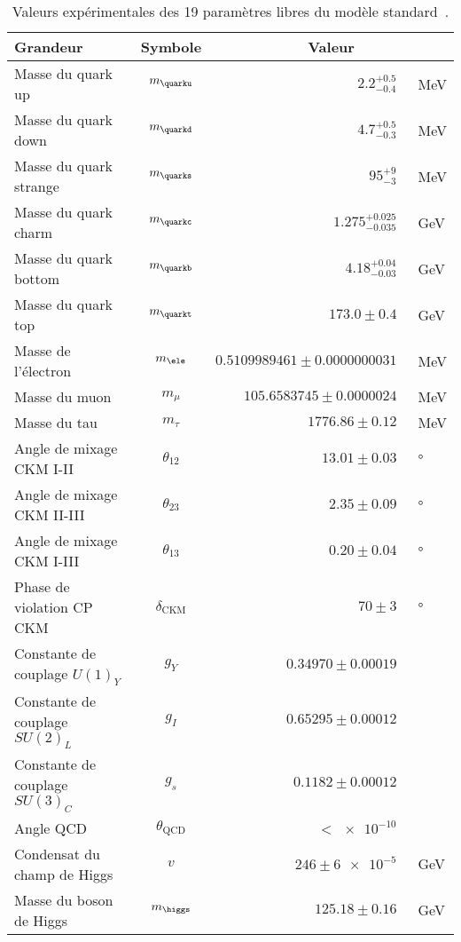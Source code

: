 \begin{table}
\centering
\begin{tabular}{lcrl}
\toprule
Grandeur & Symbole & \multicolumn{2}{c}{Valeur} \\
\midrule
Masse du quark up & $m_{\quarku}$ & $\num{2.2}^{+\num{0.5}}_{-\num{0.4}}$ & \SI{}{\MeV} \\
Masse du quark down & $m_{\quarkd}$ & $\num{4.7}^{+\num{0.5}}_{-\num{0.3}}$ & \SI{}{\MeV} \\
Masse du quark strange & $m_{\quarks}$ & $\num{95}^{+\num{9}}_{-\num{3}}$ & \SI{}{\MeV} \\
Masse du quark charm & $m_{\quarkc}$ & $\num{1.275}^{+\num{0.025}}_{-\num{0.035}}$ & \SI{}{\GeV} \\
Masse du quark bottom & $m_{\quarkb}$ & $\num{4.18}^{+\num{0.04}}_{-\num{0.03}}$ & \SI{}{\GeV} \\
Masse du quark top & $m_{\quarkt}$ & $\num{173.0}\pm\num{0.4}$ & \SI{}{\GeV} \\
Masse de l'électron & $m_{\ele}$ & $\num{0.5109989461}\pm\num{0.0000000031}$ & \SI{}{\MeV} \\
Masse du muon & $m_{\mu}$ & $\num{105.6583745}\pm\num{0.0000024}$ & \SI{}{\MeV} \\
Masse du tau & $m_{\tau}$ & $\num{1776.86}\pm\num{0.12}$ & \SI{}{\MeV} \\
Angle de mixage CKM I-II & $\theta_{12}$ & $\num{13.01}\pm\num{0.03}$ & \SI{}{\degree} \\
Angle de mixage CKM II-III & $\theta_{23}$ & $\num{2.35}\pm\num{0.09}$ & \SI{}{\degree} \\
Angle de mixage CKM I-III & $\theta_{13}$ & $\num{0.20}\pm\num{0.04}$ & \SI{}{\degree} \\
Phase de violation CP CKM & $\delta_{\text{CKM}}$ & $\num{70}\pm\num{3}$ & \SI{}{\degree} \\
Constante de couplage $U(1)_Y$ & $g_Y$ & $\num{0.34970}\pm\num{0.00019}$ & \\
Constante de couplage $SU(2)_L$ & $g_I$ & $\num{0.65295}\pm\num{0.00012}$ & \\
Constante de couplage $SU(3)_C$ & $g_s$ & $\num{0.1182}\pm\num{0.00012}$ & \\
Angle QCD & $\theta_{\text{QCD}}$ & $<\num{e-10}$ & \\
Condensat du champ de Higgs & $v$ & $\num{246}\pm\num{6e-5}$ & \SI{}{\GeV} \\
Masse du boson de Higgs & $m_{\higgs}$ & $\num{125.18}\pm\num{0.16}$ & \SI{}{\GeV} \\
\bottomrule
\end{tabular}
\caption{Valeurs expérimentales des 19 paramètres libres du modèle standard~\cite{PDG_booklet_2018}.}
\end{table}


